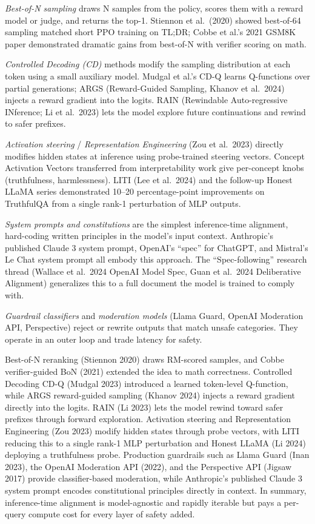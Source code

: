 \documentclass{article}
\begin{document}
\emph{Best-of-N sampling} draws N samples from the policy, scores them with a reward model or judge, and returns the top-1. Stiennon et al.~(2020) showed best-of-64 sampling matched short PPO training on TL;DR; Cobbe et al.'s 2021 GSM8K paper demonstrated dramatic gains from best-of-N with verifier scoring on math.

\emph{Controlled Decoding (CD)} methods modify the sampling distribution at each token using a small auxiliary model. Mudgal et al.'s CD-Q learns Q-functions over partial generations; ARGS (Reward-Guided Sampling, Khanov et al.~2024) injects a reward gradient into the logits. RAIN (Rewindable Auto-regressive INference; Li et al.~2023) lets the model explore future continuations and rewind to safer prefixes.

\emph{Activation steering} / \emph{Representation Engineering} (Zou et al.~2023) directly modifies hidden states at inference using probe-trained steering vectors. Concept Activation Vectors transferred from interpretability work give per-concept knobs (truthfulness, harmlessness). LITI (Lee et al.~2024) and the follow-up Honest LLaMA series demonstrated 10--20 percentage-point improvements on TruthfulQA from a single rank-1 perturbation of MLP outputs.

\emph{System prompts and constitutions} are the simplest inference-time alignment, hard-coding written principles in the model's input context. Anthropic's published Claude 3 system prompt, OpenAI's ``spec'' for ChatGPT, and Mistral's Le Chat system prompt all embody this approach. The ``Spec-following'' research thread (Wallace et al.~2024 OpenAI Model Spec, Guan et al.~2024 Deliberative Alignment) generalizes this to a full document the model is trained to comply with.

\emph{Guardrail classifiers} and \emph{moderation models} (Llama Guard, OpenAI Moderation API, Perspective) reject or rewrite outputs that match unsafe categories. They operate in an outer loop and trade latency for safety.

Best-of-N reranking (Stiennon 2020) draws RM-scored samples, and Cobbe verifier-guided BoN (2021) extended the idea to math correctness. Controlled Decoding CD-Q (Mudgal 2023) introduced a learned token-level Q-function, while ARGS reward-guided sampling (Khanov 2024) injects a reward gradient directly into the logits. RAIN (Li 2023) lets the model rewind toward safer prefixes through forward exploration. Activation steering and Representation Engineering (Zou 2023) modify hidden states through probe vectors, with LITI \citep{lee2023rlaifvs} reducing this to a single rank-1 MLP perturbation and Honest LLaMA (Li 2024) deploying a truthfulness probe. Production guardrails such as Llama Guard (Inan 2023), the OpenAI Moderation API (2022), and the Perspective API (Jigsaw 2017) provide classifier-based moderation, while Anthropic's published Claude 3 system prompt encodes constitutional principles directly in context. In summary, inference-time alignment is model-agnostic and rapidly iterable but pays a per-query compute cost for every layer of safety added.
\end{document}
